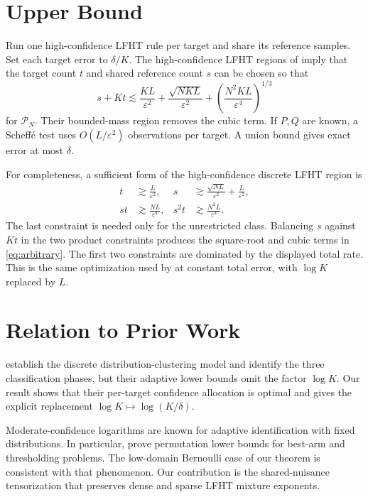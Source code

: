 \documentclass[twoside]{article}
\newcommand{\cP}{\mathcal P}
\begin{document}
\section{Upper Bound}

Run one high-confidence LFHT rule per target and share its reference samples. Set each target error to $\delta/K$. The high-confidence LFHT regions of \citet{gerber2023classification} imply that the target count $t$ and shared reference count $s$ can be chosen so that \[ s+Kt\lesssim \frac{KL}{\varepsilon^2} +\frac{\sqrt{NKL}}{\varepsilon^2} +\left(\frac{N^2KL}{\varepsilon^4}\right)^{1/3} \] for $\cP_N$. Their bounded-mass region removes the cubic term. If $P,Q$ are known, a Scheff\'e test uses $O(L/\varepsilon^2)$ observations per target. A union bound gives exact error at most $\delta$.

For completeness, a sufficient form of the high-confidence discrete LFHT region is \[
\begin{aligned}
t&\gtrsim\frac{L}{\varepsilon^2},&
s&\gtrsim\frac{\sqrt{NL}}{\varepsilon^2}+\frac{L}{\varepsilon^2},\\
st&\gtrsim\frac{NL}{\varepsilon^4},&
s^2t&\gtrsim\frac{N^2L}{\varepsilon^4}.
\end{aligned}
\] The last constraint is needed only for the unrestricted class. Balancing $s$ against $Kt$ in the two product constraints produces the square-root and cubic terms in \eqref{eq:arbitrary}. The first two constraints are dominated by the displayed total rate. This is the same optimization used by \citet{kumar2026clustering} at constant total error, with $\log K$ replaced by $L$.

\section{Relation to Prior Work}

\citet{kumar2026clustering} establish the discrete distribution-clustering model and identify the three classification phases, but their adaptive lower bounds omit the factor $\log K$. Our result shows that their per-target confidence allocation is optimal and gives the explicit replacement $\log K\mapsto\log(K/\delta)$.

Moderate-confidence logarithms are known for adaptive identification with fixed distributions. In particular, \citet{simchowitz2017simulator} prove permutation lower bounds for best-arm and thresholding problems. The low-domain Bernoulli case of our theorem is consistent with that phenomenon. Our contribution is the shared-nuisance tensorization that preserves dense and sparse LFHT mixture exponents.
\end{document}
